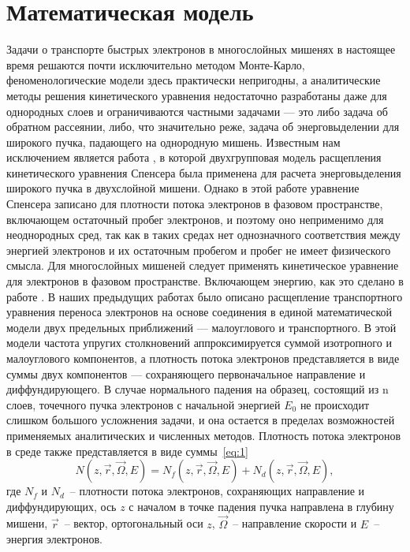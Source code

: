 \chapter{Математическая модель}
Задачи о транспорте быстрых электронов в многослойных мишенях в настоящее
время решаются почти исключительно методом Монте-Карло, феноменологические
модели здесь практически непригодны, а аналитические методы решения кинетического
уравнения недостаточно разработаны даже для однородных слоев и ограничиваются
частными задачами — это либо задача об обратном рассеянии, либо, что значительно
реже, задача об энерговыделении для широкого пучка, падающего на однородную
мишень. Известным нам исключением является работа \cite{zheng-ming}, в которой двухгрупповая
модель расщепления кинетического уравнения Спенсера была применена для расчета
энерговыделения широкого пучка в двухслойной мишени. Однако в этой работе
уравнение Спенсера записано для плотности потока электронов в фазовом пространстве,
включающем остаточный пробег электронов, и поэтому оно неприменимо для
неоднородных сред, так как в таких средах нет однозначного соответствия между
энергией электронов и их остаточным пробегом и пробег не имеет физического смысла.
Для многослойных мишеней следует применять кинетическое уравнение для электронов в
фазовом пространстве. Включающем энергию, как это сделано в работе \cite{smolar}.
В наших предыдущих работах \cite{mikheev,smolar1,smolar2} было описано расщепление транспортного
уравнения переноса электронов на основе соединения в единой математической модели
двух предельных приближений — малоуглового и транспортного. В этой модели частота
упругих столкновений аппроксимируется суммой изотропного и малоуглового
компонентов, а плотность потока электронов представляется в виде суммы двух
компонентов — сохраняющего первоначальное направление и диффундирующего.
В случае нормального падения на образец, состоящий из n слоев, точечного пучка
электронов с начальной энергией $E_0$ не происходит слишком большого усложнения
задачи, и она остается в пределах возможностей применяемых аналитических и
численных методов. Плотность потока электронов в среде также представляется в виде
суммы~\ref{eq:1}
\begin{equation}
N(z,\vec{r},\vec{\Omega},E)=N_f (z,\vec{r},\vec{\Omega},E)+N_d (z,\vec{r},\vec{\Omega},E),
\label{eq:1}
\end{equation}
где $N_f$ и $N_d$~-- плотности потока электронов, сохраняющих направление и
диффундирующих, ось $z$ с началом в точке падения пучка направлена в глубину мишени,
$\vec{r}$~-- вектор, ортогональный оси $z$, $\vec{\Omega}$~-- направление скорости и $E$~-- энергия электронов.
